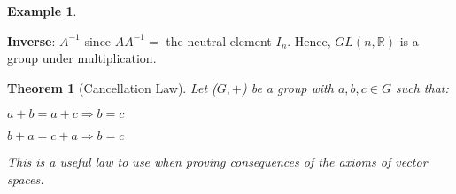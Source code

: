 \documentclass[a4paper, 12pt]{article}
\newtheorem{theorem}{Theorem}
\theoremstyle{definition}
\newtheorem{exmp}{Example}[section]
\theoremstyle{definition}
\theoremstyle{definition}
\theoremstyle{definition}
\newenvironment{enumerate_tight}{
	\begin{enumerate}
		\setlength{\itemsep}{0pt}
		\setlength{\parskip}{0pt}
	}{\end{enumerate}}
\newenvironment{itemize_tight}{
	\begin{itemize}
		\setlength{\itemsep}{0pt}
		\setlength{\parskip}{0pt}
	}{\end{itemize}}
\begin{document}
{\begin{exmp}
\begin{itemize_tight}
\begin{enumerate_tight}
		\item \textbf{Inverse}: $A^{-1}$ since $AA^{-1} =$ the neutral element $I_n$. Hence, $GL(n, \mathbb{R})$ is a group under multiplication.  
		\end{enumerate_tight}
			
	 
	\end{itemize_tight}
\end{exmp}

\begin{theorem}[Cancellation Law] 
Let ($G, +$) be a group with $a, b, c \in G$ such that: 
\begin{enumerate_tight}
	\item $a + b = a + c \Rightarrow b = c$
	\item $b + a = c + a \Rightarrow b = c$
\end{enumerate_tight}
This is a useful law to use when proving consequences of the axioms of vector spaces. 
\end{theorem}

}
\end{document}
